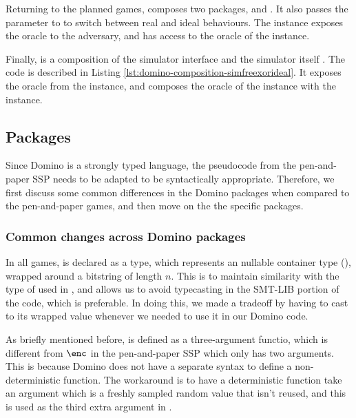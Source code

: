 

Returning to the planned games,  composes two packages,  and . It also passes the  parameter to  to switch between real and ideal behaviours. The  instance exposes the  oracle to the adversary, and has access to the  oracle of the  instance.



Finally,  is a composition of the simulator interface   and the simulator itself . The code is described in Listing \ref{lst:domino-composition-simfreexorideal}. It exposes the  oracle from the  instance, and composes the  oracle of the  instance with the  instance. 



\subsection{Packages}
\label{subsec:encodepackages}
Since Domino is a strongly typed language, the pseudocode from the pen-and-paper SSP needs to be adapted to be syntactically appropriate. Therefore, we first discuss  some common differences in the Domino packages when compared to the pen-and-paper games, and then move on the the specific packages.

\subsubsection{Common changes across Domino packages}
\label{subsubsec:commonchangesindomino}
In all games,  is declared as a  type, which represents an nullable container type (), wrapped around a bitstring of length $n$. This is to maintain similarity with the type of  used in , and allows us to avoid typecasting in the SMT-LIB portion of the code, which is preferable. In doing this, we made a tradeoff by having to cast  to its wrapped value whenever we needed to use it in our Domino code.

As briefly mentioned before,  is defined as a three-argument functio, which is different from $\enc$ in the pen-and-paper SSP which only has two arguments. This is because Domino does not have a separate syntax to define a non-deterministic function. The workaround is to have a deterministic function take an argument which is a freshly sampled random value that isn't reused, and this is used as the third extra argument in .

